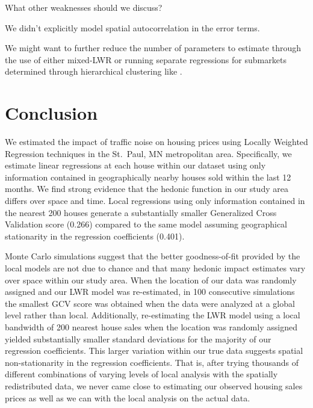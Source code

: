 \documentclass{article}\usepackage{graphicx, color}
\begin{document}
What other weaknesses should we discuss?

We didn't explicitly model spatial autocorrelation in the error terms. 

We might want to further reduce the number of parameters to estimate through the use of either mixed-LWR or running separate regressions for submarkets determined through hierarchical clustering like \citet{Day2003}.

\section{Conclusion}

We estimated the impact of traffic noise on housing prices using Locally Weighted Regression techniques in the St.\ Paul, MN metropolitan area. Specifically, we estimate linear regressions at each house within our dataset using only information contained in geographically nearby houses sold within the last 12 months. We find strong evidence that the hedonic function in our study area differs over space and time. Local regressions using only information contained in the nearest 200 houses generate a substantially smaller Generalized Cross Validation score (0.266) compared to the same model assuming geographical stationarity in the regression coefficients (0.401). 

Monte Carlo simulations suggest that the better goodness-of-fit provided by the local models are not due to chance and that many hedonic impact estimates vary over space within our study area. When the location of our data was randomly assigned and our LWR model was re-estimated, in 100 consecutive simulations the smallest GCV score was  obtained when the data were analyzed at a global level rather than local. Additionally, re-estimating the LWR model using a local bandwidth of 200 nearest house sales when the location was randomly assigned yielded substantially smaller standard deviations for the majority of our regression coefficients. This larger variation within our true data suggests spatial non-stationarity in the regression coefficients. That is, after trying thousands of different combinations of varying levels of local analysis with the spatially redistributed data, we never came close to estimating our observed housing sales prices as well as we can with the local analysis on the actual data. 
\end{document}
